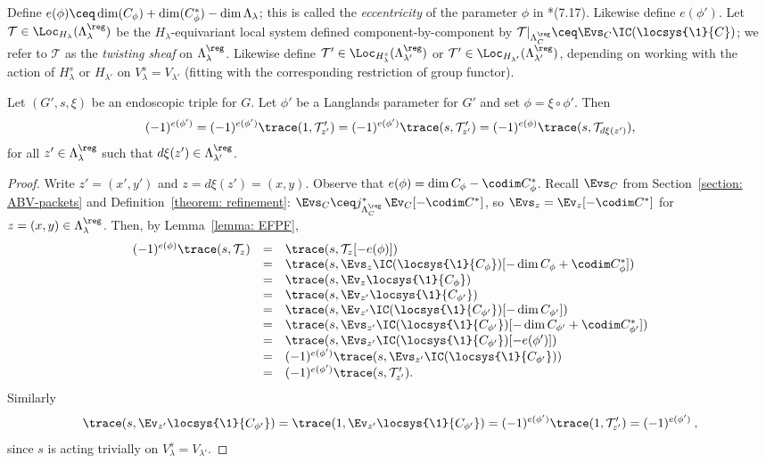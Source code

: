 \documentclass[11pt,letterpaper]{amsart}
\numberwithin{equation}{section}
\begin{document}
Define $e(\phi) \ceq \dim(C_\phi) + \dim(C_\phi^*) - \dim \Lambda_\lambda$; this is called the {\it eccentricity} of the parameter $\phi$ in \cite{CFMMX22}*{(7.17)}.
Likewise define $e(\phi')$.
    Let $\mathcal{T}\in \Loc_{H_\lambda}(\Lambda_\lambda^\reg)$ be the $H_\lambda$-equivariant local system defined component-by-component by $\mathcal{T}\vert_{\Lambda^\reg_{C}} \ceq \Evs_{C}\IC(\locsys{\1}{C})$; we refer to $\mathcal{T}$ as the {\it twisting sheaf} on $\Lambda^\reg_\lambda$.
    Likewise define $\mathcal{T}'\in \Loc_{H^s_{\lambda}}(\Lambda_{\lambda'}^\reg)$ or $\mathcal{T}'\in \Loc_{H_{\lambda'}}(\Lambda_{\lambda'}^\reg)$,
    depending on working with the action of $H^s_{\lambda} $ or $H_{\lambda'} $ on $V_{\lambda}^s=V_{\lambda'}$ (fitting with the corresponding restriction of group functor).


\begin{lemma}\label{lemma: eccentricity}
Let $(G',s,\xi)$ be an endoscopic triple for $G$.
Let $\phi'$ be a Langlands parameter for $G'$ and set $\phi = \xi\circ\phi'$.
Then
\[(-1)^{e(\phi')}=
(-1)^{e(\phi')}\trace({1},\mathcal{T}'_{z'}) 
=
(-1)^{e(\phi')}\trace({s},\mathcal{T}'_{z'}) 
=
(-1)^{e(\phi)}\trace({s},\mathcal{T}_{d\xi(z')}),
\]   
for all $z'\in \Lambda^\reg_{\lambda}$ such that $d\xi(z')\in \Lambda^\reg_{\lambda'}$.
\end{lemma}

\begin{proof}
Write $z'=(x',y')$ and $z=d\xi(z') = (x,y)$. 
Observe that $e(\phi) = \dim C_\phi - \codim C^*_{\phi}$.
Recall $\Evs_{C}$ from Section~\ref{section: ABV-packets} and Definition~\ref{theorem: refinement}: $\Evs_{C} \ceq j^*_{\Lambda^\reg_{C}}\, \Ev_{C}[-\codim C^*]$, so
$\Evs_{z} = \Ev_{z}[-\codim C^*]$
for $z=(x,y)\in \Lambda_\lambda^\reg$.
Then, by Lemma~\ref{lemma: EFPF},
\[
\begin{array}{rcl}
(-1)^{e(\phi)}
\trace(s, \mathcal{T}_{z})
&=&
\trace(s, \mathcal{T}_{z}[-e(\phi)])\\
&=&
\trace(s, \Evs_{z}\IC(\locsys{\1}{C_{\phi}})[-\dim C_\phi+\codim C^*_\phi])\\
&=& \trace(s, \Ev_z\locsys{\1}{C_{\phi}})\\
&=&
 \trace(s, \Ev_{z'}\locsys{\1}{C_{\phi'}})\\
&=&
 \trace(s, \Ev_{z'}\IC(\locsys{\1}{C_{\phi'}})[-\dim C_{\phi'}]) \\
&=&
 \trace(s, \Evs_{z'}\IC(\locsys{\1}{C_{\phi'}})[-\dim C_{\phi'}+\codim C^*_{\phi'}])\\
&=&
 \trace(s, \Evs_{z'}\IC(\locsys{\1}{C_{\phi'}})[-e(\phi')])\\
&=& (-1)^{e(\phi')}
 \trace(s, \Evs_{z'}\IC(\locsys{\1}{C_{\phi'}}))\\
&=& (-1)^{e(\phi')}
 \trace(s, \mathcal{T}'_{z'}).
\end{array} 
\]
Similarly $$\trace(s, \Ev_{z'}\locsys{\1}{C_{\phi'}})=
\trace(1, \Ev_{z'}\locsys{\1}{C_{\phi'}}) =(-1)^{e(\phi')}
 \trace(1, \mathcal{T}'_{z'}) =(-1)^{e(\phi')} \:,
$$
since $s$ is acting trivially on $V_{\lambda}^s=V_{\lambda'}$.
\end{proof}
\end{document}
